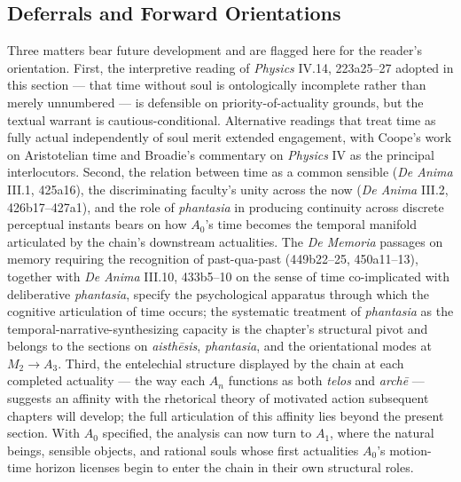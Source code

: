 \subsection*{Deferrals and Forward Orientations}

Three matters bear future development and are flagged here for the reader's orientation. First, the interpretive reading of \textit{Physics} IV.14, 223a25--27 adopted in this section --- that time without soul is ontologically incomplete rather than merely unnumbered --- is defensible on priority-of-actuality grounds, but the textual warrant is cautious-conditional. Alternative readings that treat time as fully actual independently of soul merit extended engagement, with Coope's work on Aristotelian time and Broadie's commentary on \textit{Physics} IV as the principal interlocutors. Second, the relation between time as a common sensible (\textit{De Anima} III.1, 425a16), the discriminating faculty's unity across the now (\textit{De Anima} III.2, 426b17--427a1), and the role of \textit{phantasia} in producing continuity across discrete perceptual instants bears on how $A_0$'s time becomes the temporal manifold articulated by the chain's downstream actualities. The \textit{De Memoria} passages on memory requiring the recognition of past-qua-past (449b22--25, 450a11--13), together with \textit{De Anima} III.10, 433b5--10 on the sense of time co-implicated with deliberative \textit{phantasia}, specify the psychological apparatus through which the cognitive articulation of time occurs; the systematic treatment of \textit{phantasia} as the temporal-narrative-synthesizing capacity is the chapter's structural pivot and belongs to the sections on \textit{aisthēsis}, \textit{phantasia}, and the orientational modes at $M_2 \rightarrow A_3$. Third, the entelechial structure displayed by the chain at each completed actuality --- the way each $A_n$ functions as both \textit{telos} and \textit{archē} --- suggests an affinity with the rhetorical theory of motivated action subsequent chapters will develop; the full articulation of this affinity lies beyond the present section. With $A_0$ specified, the analysis can now turn to $A_1$, where the natural beings, sensible objects, and rational souls whose first actualities $A_0$'s motion-time horizon licenses begin to enter the chain in their own structural roles.
